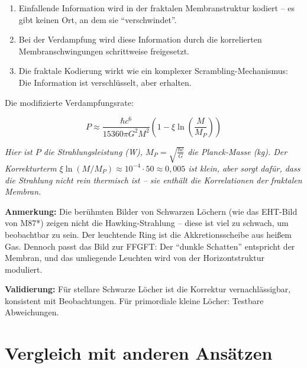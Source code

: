	\begin{enumerate}
		\item Einfallende Information wird in der fraktalen Membranstruktur kodiert -- es gibt keinen Ort, an dem sie \enquote{verschwindet}.
		\item Bei der Verdampfung wird diese Information durch die korrelierten Membranschwingungen schrittweise freigesetzt.
		\item Die fraktale Kodierung wirkt wie ein komplexer Scrambling-Mechanismus: Die Information ist verschlüsselt, aber erhalten.
	\end{enumerate}
	
	Die modifizierte Verdampfungsrate:
	
	\begin{equation}
		P \approx \frac{\hbar c^6}{15360 \pi G^2 M^2} \left(1 - \xi \ln\left(\frac{M}{M_P}\right)\right)
	\end{equation}
	
	\textit{Hier ist \(P\) die Strahlungsleistung (W), \(M_P = \sqrt{\frac{\hbar c}{G}}\) die Planck-Masse (kg). Der Korrekturterm \(\xi \ln(M/M_P) \approx 10^{-4} \cdot 50 \approx 0{,}005\) ist klein, aber sorgt dafür, dass die Strahlung nicht rein thermisch ist -- sie enthält die Korrelationen der fraktalen Membran.}
	
	\textbf{Anmerkung:} Die berühmten Bilder von Schwarzen Löchern (wie das EHT-Bild von M87*) zeigen nicht die Hawking-Strahlung -- diese ist viel zu schwach, um beobachtbar zu sein. Der leuchtende Ring ist die Akkretionsscheibe aus heißem Gas. Dennoch passt das Bild zur FFGFT: Der \enquote{dunkle Schatten} entspricht der Membran, und das umliegende Leuchten wird von der Horizontstruktur moduliert.
	
	\textbf{Validierung:} Für stellare Schwarze Löcher ist die Korrektur vernachlässigbar, konsistent mit Beobachtungen. Für primordiale kleine Löcher: Testbare Abweichungen.
	
	\section{Vergleich mit anderen Ansätzen}
	
\begin{center}
	\small %
\end{center}
	
